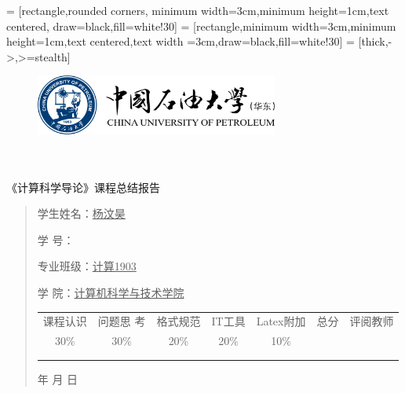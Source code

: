 \documentclass{article}
\renewcommand{\today}{\number\year 年 \number\month 月 \number\day 日}
\begin{document}
 = [rectangle,rounded corners, minimum width=3cm,minimum height=1cm,text centered, draw=black,fill=white!30]
 = [rectangle,minimum width=3cm,minimum height=1cm,text centered,text width =3cm,draw=black,fill=white!30]
 = [thick,->,>=stealth]
\begin{figure}
    \centering
    \includegraphics[width=8cm]{upc.png}

    \label{figupc}
\end{figure}

	\begin{center}
		\quad \\
		\quad \\
		\heiti \fontsize{45}{17} \quad \quad \quad 
		\vskip 1.5cm
		\heiti {} 《计算科学导论》课程总结报告
	\end{center}
	\vskip 2.0cm
		
	\begin{quotation}
		\doublespacing
		
        \par\setlength\parindent{7em}
		\quad 

		学生姓名：\underline{\qquad  杨汶昊 \qquad \qquad}

		学\hspace{0.61cm} 号：\underline{\qquad}
		
		专业班级：\underline{\qquad 计算1903 \qquad  }
		
        学\hspace{0.61cm} 院：\underline{计算机科学与技术学院}
		\vskip 2cm
		\centering
		\begin{table}[h]
            \centering 
            \begin{tabular}{|c|c|c|c|c|c|c|}
                \hline
                课程认识 & 问题思 考 & 格式规范  & IT工具  & Latex附加  & 总分 & 评阅教师 \\
                30\% & 30\% & 20\% & 20\% & 10\% &  &  \\
                \hline
                 & & & & & &\\
                & & & & & &\\
                \hline
            \end{tabular}
        \end{table}
		\vskip 2cm
		\today
	\end{quotation}
\end{document}
